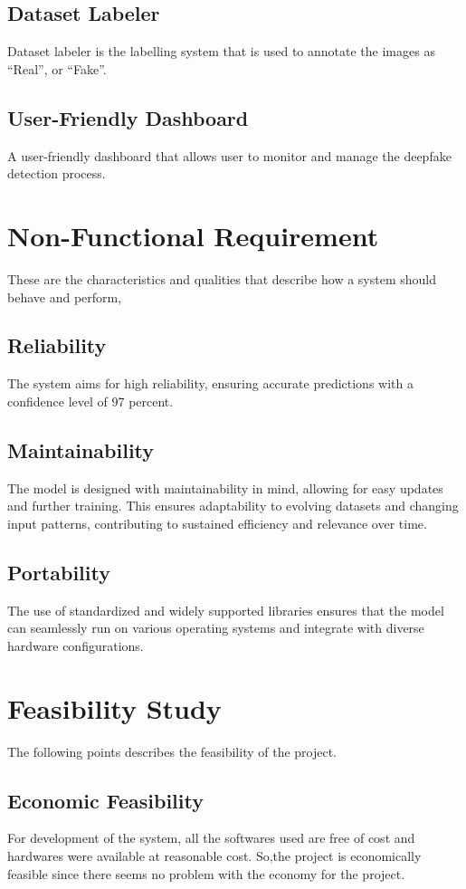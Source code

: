     \subsection{Dataset Labeler}
        Dataset labeler is the labelling system that is used to annotate the images as “Real”, or “Fake”.

    \subsection{User-Friendly Dashboard}
        A user-friendly dashboard that allows user to monitor and manage the deepfake detection process.

\section{Non-Functional Requirement}
    These are the characteristics and qualities that describe how a system should behave and perform,

    \subsection{Reliability}
        The system aims for high reliability, ensuring accurate predictions with a confidence level of 97 percent.
    \subsection{Maintainability}
        The model is designed with maintainability in mind, allowing for easy updates and further training. This ensures adaptability to evolving datasets and changing input patterns, contributing to sustained efficiency and relevance over time.
    \subsection{Portability}
        The use of standardized and widely supported libraries ensures that the model can seamlessly run on various operating systems and integrate with diverse hardware configurations.
    
\newpage
\section{Feasibility Study}
    The following points describes the feasibility of the project.

    \subsection{Economic Feasibility}
        For development of the system, all the softwares used are free of cost and hardwares were available  at reasonable cost. So,the project is economically feasible since there seems no problem with the economy for the project.

